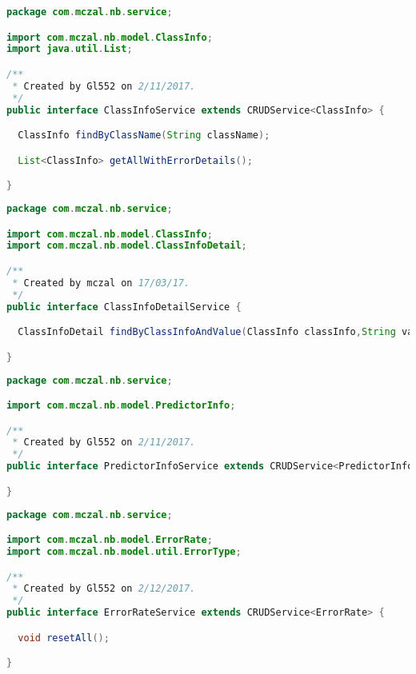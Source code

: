 \begin{lstlisting}[language=Java,basicstyle=\tiny,caption=ClassInfoService.java]
package com.mczal.nb.service;

import com.mczal.nb.model.ClassInfo;
import java.util.List;

/**
 * Created by Gl552 on 2/11/2017.
 */
public interface ClassInfoService extends CRUDService<ClassInfo> {

  ClassInfo findByClassName(String className);

  List<ClassInfo> getAllWithErrorDetails();

}

\end{lstlisting}


\begin{lstlisting}[language=Java,basicstyle=\tiny,caption=ClassInfoDetailService.java]
package com.mczal.nb.service;

import com.mczal.nb.model.ClassInfo;
import com.mczal.nb.model.ClassInfoDetail;

/**
 * Created by mczal on 17/03/17.
 */
public interface ClassInfoDetailService {

  ClassInfoDetail findByClassInfoAndValue(ClassInfo classInfo,String value);

}

\end{lstlisting}


\begin{lstlisting}[language=Java,basicstyle=\tiny,caption=PredictorInfoService.java]
package com.mczal.nb.service;

import com.mczal.nb.model.PredictorInfo;

/**
 * Created by Gl552 on 2/11/2017.
 */
public interface PredictorInfoService extends CRUDService<PredictorInfo> {

}

\end{lstlisting}


\begin{lstlisting}[language=Java,basicstyle=\tiny,caption=ErrorRateService.java]
package com.mczal.nb.service;

import com.mczal.nb.model.ErrorRate;
import com.mczal.nb.model.util.ErrorType;

/**
 * Created by Gl552 on 2/12/2017.
 */
public interface ErrorRateService extends CRUDService<ErrorRate> {

  void resetAll();

}

\end{lstlisting}


